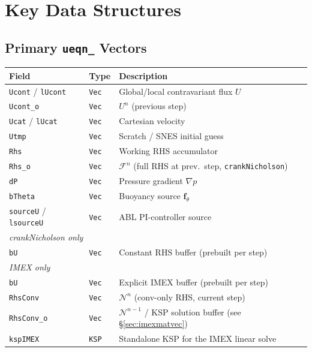 \documentclass[12pt,a4paper]{article}
\newcommand{\cN}{\mathcal{N}}
\begin{document}
	\section{Key Data Structures}
	
	\subsection{Primary \texttt{ueqn\_} Vectors}
	
	\begin{center}
		\begin{tabular}{lll}
			\toprule
			Field & Type & Description \\
			\midrule
			\texttt{Ucont} / \texttt{lUcont} & \texttt{Vec} & Global/local contravariant flux $U$\\
			\texttt{Ucont\_o} & \texttt{Vec} & $U^n$ (previous step) \\
			\texttt{Ucat} / \texttt{lUcat} & \texttt{Vec} & Cartesian velocity \\
			\texttt{Utmp} & \texttt{Vec} & Scratch / SNES initial guess \\
			\texttt{Rhs} & \texttt{Vec} & Working RHS accumulator \\
			\texttt{Rhs\_o} & \texttt{Vec} & $\mathcal{F}^n$ (full RHS at prev.\ step, \texttt{crankNicholson}) \\
			\texttt{dP} & \texttt{Vec} & Pressure gradient $\nabla p$ \\
			\texttt{bTheta} & \texttt{Vec} & Buoyancy source $\bm{f}_\theta$ \\
			\texttt{sourceU} / \texttt{lsourceU} & \texttt{Vec} & ABL PI-controller source \\
			\midrule
			\multicolumn{3}{l}{\emph{crankNicholson only}} \\
			\texttt{bU} & \texttt{Vec} & Constant RHS buffer (prebuilt per step) \\
			\midrule
			\multicolumn{3}{l}{\emph{IMEX only}} \\
			\texttt{bU} & \texttt{Vec} & Explicit IMEX buffer (prebuilt per step) \\
			\texttt{RhsConv} & \texttt{Vec} & $\cN^n$ (conv-only RHS, current step) \\
			\texttt{RhsConv\_o} & \texttt{Vec} & $\cN^{n-1}$ / KSP solution buffer (see \S\ref{sec:imexmatvec}) \\
			\texttt{kspIMEX} & \texttt{KSP} & Standalone KSP for the IMEX linear solve \\

\end{tabular}
\end{center}
\end{document}
